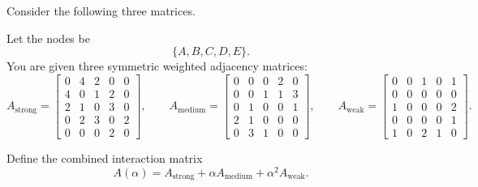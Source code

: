 \documentclass[]{exam}
\numberwithin{equation}{section}
\begin{document}
\begin{questions}
\begin{parts}
\end{parts}

\pagebreak

\question Consider the following three matrices.  

Let the nodes be
\[
\{A,B,C,D,E\}.
\]
You are given three symmetric weighted adjacency matrices:
\[
A_{\text{strong}}=
\begin{bmatrix}
0 & 4 & 2 & 0 & 0\\
4 & 0 & 1 & 2 & 0\\
2 & 1 & 0 & 3 & 0\\
0 & 2 & 3 & 0 & 2\\
0 & 0 & 0 & 2 & 0
\end{bmatrix},
\qquad
A_{\text{medium}}=
\begin{bmatrix}
0 & 0 & 0 & 2 & 0\\
0 & 0 & 1 & 1 & 3\\
0 & 1 & 0 & 0 & 1\\
2 & 1 & 0 & 0 & 0\\
0 & 3 & 1 & 0 & 0
\end{bmatrix},
\qquad
A_{\text{weak}}=
\begin{bmatrix}
0 & 0 & 1 & 0 & 1\\
0 & 0 & 0 & 0 & 0\\
1 & 0 & 0 & 0 & 2\\
0 & 0 & 0 & 0 & 1\\
1 & 0 & 2 & 1 & 0
\end{bmatrix}.
\]

Define the combined interaction matrix
\[
A(\alpha)=A_{\text{strong}}+\alpha A_{\text{medium}}+\alpha^2 A_{\text{weak}}.
\]

\end{questions}
\end{document}
